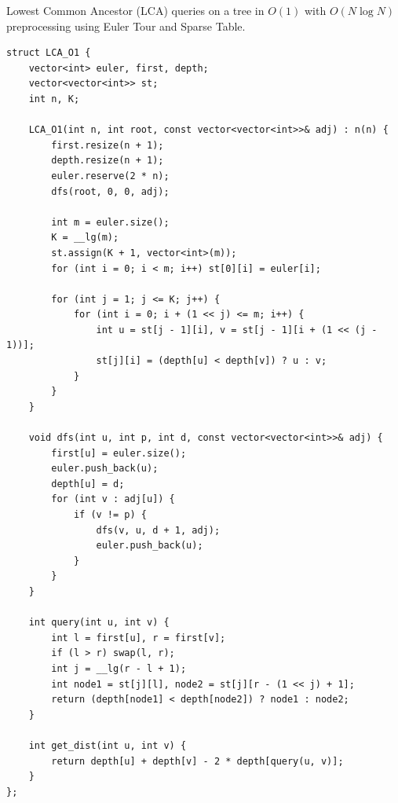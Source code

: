 
Lowest Common Ancestor (LCA) queries on a tree in $O(1)$ with $O(N \log N)$ preprocessing using Euler Tour and Sparse Table.
\begin{lstlisting}
struct LCA_O1 {
    vector<int> euler, first, depth;
    vector<vector<int>> st;
    int n, K;

    LCA_O1(int n, int root, const vector<vector<int>>& adj) : n(n) {
        first.resize(n + 1);
        depth.resize(n + 1);
        euler.reserve(2 * n);
        dfs(root, 0, 0, adj);
        
        int m = euler.size();
        K = __lg(m);
        st.assign(K + 1, vector<int>(m));
        for (int i = 0; i < m; i++) st[0][i] = euler[i];
        
        for (int j = 1; j <= K; j++) {
            for (int i = 0; i + (1 << j) <= m; i++) {
                int u = st[j - 1][i], v = st[j - 1][i + (1 << (j - 1))];
                st[j][i] = (depth[u] < depth[v]) ? u : v;
            }
        }
    }

    void dfs(int u, int p, int d, const vector<vector<int>>& adj) {
        first[u] = euler.size();
        euler.push_back(u);
        depth[u] = d;
        for (int v : adj[u]) {
            if (v != p) {
                dfs(v, u, d + 1, adj);
                euler.push_back(u);
            }
        }
    }

    int query(int u, int v) {
        int l = first[u], r = first[v];
        if (l > r) swap(l, r);
        int j = __lg(r - l + 1);
        int node1 = st[j][l], node2 = st[j][r - (1 << j) + 1];
        return (depth[node1] < depth[node2]) ? node1 : node2;
    }

    int get_dist(int u, int v) {
        return depth[u] + depth[v] - 2 * depth[query(u, v)];
    }
};
\end{lstlisting}

